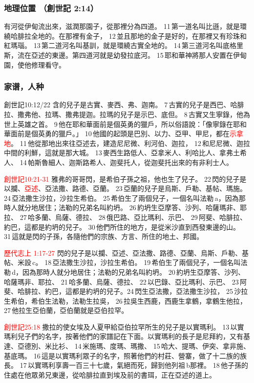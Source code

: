 \subsubsection{地理位置 （創世記 2:14）}

有河從伊甸流出來，滋潤那園子，從那裡分為四道。 11 第一道名叫比遜，就是環繞哈腓拉全地的。在那裡有金子， 12 並且那地的金子是好的，在那裡又有珍珠和紅瑪瑙。 13 第二道河名叫基訓，就是環繞古實全地的。 14 第三道河名叫底格里斯，流在亞述的東邊。第四道河就是幼發拉底河。 15 耶和華神將那人安置在伊甸園，使他修理看守。

\subsubsection{家谱，人种}
創世記10:12/22
含的兒子是古實、麥西、弗、迦南。 7 古實的兒子是西巴、哈腓拉、撒弗他、拉瑪、撒弗提迦。拉瑪的兒子是示巴、底但。 8 古實又生寧錄，他為世上英雄之首。 9 他在耶和華面前是個英勇的獵戶，所以俗語說：「像寧錄在耶和華面前是個英勇的獵戶。」 10 他國的起頭是巴別、以力、亞甲、甲尼，都在\textcolor{red}{示拿地}。 11 他從那地出來往亞述去，建造尼尼微、利河伯、迦拉， 12 和尼尼微、迦拉中間的利鮮，這就是那大城。 13 麥西生路低人、亞拿米人、利哈比人、拿弗土希人、 14 帕斯魯細人、迦斯路希人、迦斐托人，從迦斐托出來的有非利士人。

\textcolor{red}{創世記10:21-31}
雅弗的哥哥閃，是希伯子孫之祖，他也生了兒子。 22 閃的兒子是以攔、\textcolor{red}{亞述}、亞法撒、路德、亞蘭。 23 亞蘭的兒子是烏斯、戶勒、基帖、瑪施。 24 亞法撒生沙拉，沙拉生希伯。 25 希伯生了兩個兒子，一個名叫法勒 a，因為那時人就分地居住；法勒的兄弟名叫約坍。 26 約坍生亞摩答、沙列、哈薩瑪非、耶拉、 27 哈多蘭、烏薩、德拉、 28 俄巴路、亞比瑪利、示巴、 29 阿斐、哈腓拉、約巴，這都是約坍的兒子。 30 他們所住的地方，是從米沙直到西發東邊的山。 31 這就是閃的子孫，各隨他們的宗族、方言、所住的地土、邦國。

\textcolor{red}{歷代志上 1:17-27}
閃的兒子是以攔、亞述、亞法撒、路德、亞蘭、烏斯、戶勒、基帖、米設 c。 18 亞法撒生沙拉，沙拉生希伯。 19 希伯生了兩個兒子，一個名叫法勒 d，因為那時人就分地居住；法勒的兄弟名叫約坍。 20 約坍生亞摩答、沙列、哈薩瑪非、耶拉、 21 哈多蘭、烏薩、德拉、 22 以巴錄、亞比瑪利、示巴、 23 阿斐、哈腓拉、約巴，這都是約坍的兒子。24 閃生亞法撒，亞法撒生沙拉， 25 沙拉生希伯，希伯生法勒，法勒生拉吳， 26 拉吳生西鹿，西鹿生拿鶴，拿鶴生他拉， 27 他拉生亞伯蘭，亞伯蘭就是亞伯拉罕。

\textcolor{red}{創世記25:18}
撒拉的使女埃及人夏甲給亞伯拉罕所生的兒子是以實瑪利。 13 以實瑪利兒子們的名字，按著他們的家譜記在下面。以實瑪利的長子是尼拜約，又有基達、亞德別、米比衫、 14 米施瑪、度瑪、瑪撒、 15 哈大、提瑪、伊突、拿非施、基底瑪。 16 這是以實瑪利眾子的名字，照著他們的村莊、營寨，做了十二族的族長。 17 以實瑪利享壽一百三十七歲，氣絕而死，歸到他列祖 b那裡。 18 他子孫的住處在他眾弟兄東邊，從哈腓拉直到埃及前的書珥，正在亞述的道上。


